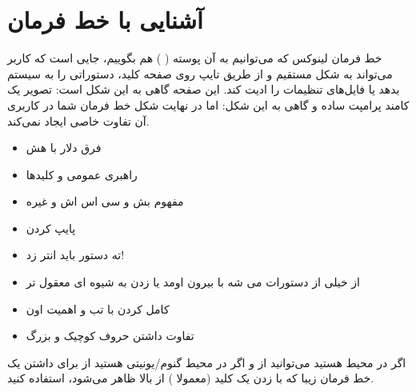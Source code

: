 \section{آشنایی با خط فرمان}
خط فرمان لینوکس که می‌توانیم به آن پوسته (
) هم بگوییم، جایی است که کاربر می‌تواند به شکل مستقیم و از طریق تایپ روی صفحه کلید، دستوراتی را به سیستم بدهد یا فایل‌های تنظیمات را ادیت کند. این صفحه گاهی به این شکل است:
تصویر یک کامند پرامپت ساده
و گاهی به این شکل:
اما در نهایت شکل خط فرمان شما در کاربری آن تفاوت خاصی ایجاد نمی‌کند.
\begin{itemize}
	\item فرق دلار با هش
	\item راهبری عمومی و کلیدها
	\item مفهوم بش و سی اس اش و غیره
	\item پایپ کردن
	\item ته دستور باید انتر زد!
	\item از خیلی از دستورات می شه با 
 بیرون اومد یا زدن
  به شیوه ای معقول تر
	\item کامل کردن با تب و اهمیت اون
	\item تفاوت داشتن حروف کوچیک و بزرگ
\end{itemize}
\begin{mybox}
اگر در محیط
هستید می‌توانید از 
و اگر در محیط گنوم/یونیتی هستید از 
برای داشتن یک خط فرمان زیبا که با زدن یک کلید (معمولا 
) از بالا ظاهر می‌شود، استفاده کنید.
\end{mybox}
